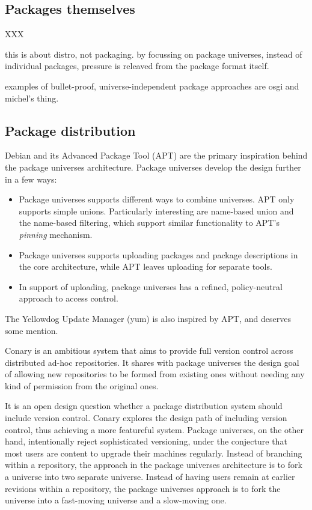 \documentclass{article}
\begin{document}
\subsection{Packages themselves}

XXX

this is about distro, not packaging.  by focussing on package universes,
instead of individual packages, pressure is releaved from the package
format itself.

examples of bullet-proof, universe-independent package approaches are
osgi and michel's thing.


\subsection{Package distribution}

Debian and its Advanced Package Tool (APT)
are the primary inspiration behind the package universes architecture.
Package universes develop the design further in a few ways:
\begin{itemize}
\item Package universes supports different ways to combine universes.
      APT only supports simple unions.  Particularly interesting are
      name-based union and the name-based filtering, which support
      similar functionality to APT's \emph{pinning} mechanism.

\item Package universes supports uploading packages and package
      descriptions in the core architecture, while APT leaves
      uploading for separate tools.

\item In support of uploading, package universes has a refined,
      policy-neutral approach to access control.
\end{itemize}

The Yellowdog Update Manager (yum) is also inspired by APT, and deserves
some mention.


Conary is an ambitious system that aims to provide full version
control across distributed ad-hoc repositories.  
It shares with
package universes the design goal of allowing new repositories to be
formed from existing ones without needing any kind of permission from
the original ones.

It is an open design question whether a package distribution system
should include version control.  Conary explores the design path of
including version control, thus achieving a more featureful system.
Package universes, on the other hand, intentionally reject
sophisticated versioning, under the conjecture that most users are
content to upgrade their machines regularly.  Instead of branching
within a repository, the approach in the package universes
architecture is to fork a universe into two separate universe.
Instead of having users remain at earlier revisions within a
repository, the package universes approach is to fork the universe
into a fast-moving universe and a slow-moving one.
\end{document}

